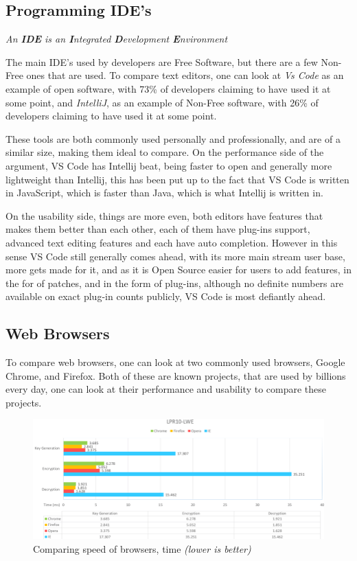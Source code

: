 \documentclass[a4paper,12pt]{article}
\begin{document}
{\subsection{Programming IDE's}
\textit{An \textbf{IDE} is an \textbf{I}ntegrated \textbf{D}evelopment \textbf{E}nvironment}

The main IDE's used by developers are Free Software, but there are a few Non-Free ones that are used.
To compare text editors, one can look at \textit{Vs Code} as an example of open software, with 73\% of 
developers claiming to have used it at some point, and \textit{IntelliJ}, as an example of Non-Free 
software, with 26\% of developers claiming to have used it at some point\cite{IDEusage}.

These tools are both commonly used personally and professionally, and are of a similar size, making them
ideal to compare. On the performance side of the argument, VS Code has Intellij beat, being faster to open
and generally more lightweight than Intellij, this has been put up to the fact that VS Code is written in 
JavaScript, which is faster than Java, which is what Intellij is written in\cite{VSCODEvsintellij}.

On the usability side, things are more even, both editors have features that makes them better than each other,
each of them have plug-ins support, advanced text editing features and each have auto completion. However in this
sense VS Code still generally comes ahead, with its more main stream user base, more gets made for it, and as
it is Open Source easier for users to add features, in the for of patches, and in the form of plug-ins, although
no definite numbers are available on exact plug-in counts publicly, VS Code is most defiantly ahead.

\subsection{Web Browsers}
To compare web browsers, one can look at two commonly used browsers, Google Chrome, and Firefox. Both of these
are known projects, that are used by billions every day, one can look at their performance and usability to compare
these projects. 

\begin{figure}[h]
	\caption{Comparing speed of browsers, time \textit{(lower is better)}}
	\includegraphics[width=\textwidth]{webbrowserperfomace.png}
\end{figure}

}
\end{document}
